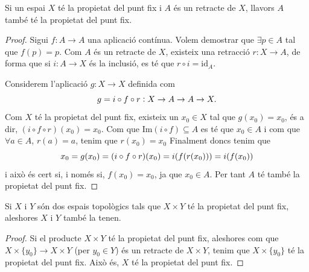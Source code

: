 \documentclass[../main.tex]{subfiles}
\begin{document}
\begin{prop}
[Exercici 11a]\label{exercici2.11.a} Si un espai $X$ té la propietat del punt fix i $A$ és un retracte de $X$, llavors $A$ també té la propietat del punt fix.
\end{prop}
\begin{proof}
Sigui $f:A\rightarrow A$ una aplicació contínua. Volem demostrar que $\exists p\in A$ tal que $f(p) = p$. Com $A$ és un retracte de $X$, existeix una retracció $r:X\rightarrow A$, de forma que si $i:A\rightarrow X$ és la inclusió, es té que $r\circ i = \mathrm{id}_A$.

Considerem l'aplicació $g:X\rightarrow X$ definida com
\begin{equation}
    \notag
    g= i\circ f\circ r: X\rightarrow A\rightarrow A\rightarrow X.
\end{equation}
Com $X$ té la propietat del punt fix, existeix un $x_0\in X$ tal que $g(x_0) = x_0$, és a dir, $(i\circ f\circ r)(x_0) = x_0$. Com que $\mathrm{Im}(i\circ f)\subseteq A$ es té que $x_0\in A$ i com que $\forall a\in A$, $r(a) = a$, tenim que $r(x_0) = x_0$ Finalment doncs tenim que
\begin{equation}
    \notag
    x_0 = g(x_0) = (i\circ f\circ r)(x_0) = i(f(r(x_0))) = i(f(x_0))
\end{equation}
i això és cert si, i només si, $f(x_0) = x_0$, ja que $x_0\in A$. Per tant $A$ té també la propietat del punt fix.
\end{proof}

\begin{coro}[Exercici 11a]\label{exercici2.11.a.2}
Si $X$ i $Y$ són dos espais topològics tals que $X\times Y$ té la propietat del punt fix, aleshores $X$ i $Y$ també la tenen.
\end{coro}
\begin{proof}
Si el producte $X\times Y$ té la propietat del punt fix, aleshores com que $X\times \{y_0\}\rightarrow X\times Y$ (per $y_0\in Y$) és un retracte de $X\times Y$, tenim que $X\times \{y_0\}$ té la propietat del punt fix. Això és, $X$ té la propietat del punt fix.
\end{proof}
\end{document}
